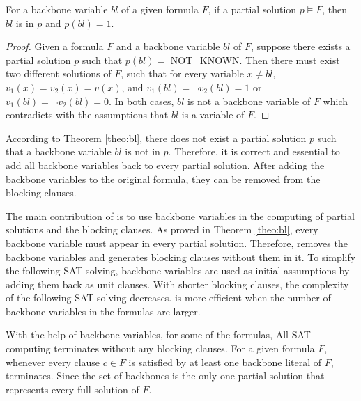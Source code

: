 \begin{theorem} \label{theo:bl}
For a backbone variable $bl$ of a given formula $F$, if a partial solution $p\models F$, then $bl$ is in $p$ and $p(bl)=1$.
\end{theorem}

\begin{proof}
Given a formula $F$ and a backbone variable $bl$ of $F$, suppose there exists a partial solution $p$ such that $p(bl)=$ NOT\_KNOWN. Then there must exist two different solutions of $F$, such that for every variable $x\neq bl$, $v_1(x)=v_2(x)=v(x)$, and $v_1(bl)=\neg v_2(bl)=1$ or $v_1(bl)=\neg v_2(bl)=0$. In both cases, $bl$ is not a backbone variable of $F$ which contradicts with the assumptions that $bl$ is a variable of $F$.
\end{proof}
According to Theorem \ref{theo:bl}, there does not exist a partial solution $p$ such that a backbone variable $bl$ is not in $p$. Therefore, it is correct and essential to add all backbone variables back to every partial solution.
After adding the backbone variables to the original formula, they can be removed from the blocking clauses.

The main contribution of \tool is to use backbone variables in the computing of partial solutions and the blocking clauses. As proved in Theorem \ref{theo:bl}, every backbone variable must appear in every partial solution. Therefore, \tool removes the backbone variables and generates blocking clauses without them in it. To simplify the following SAT solving, backbone variables are used as initial assumptions by adding them back as unit clauses. With shorter blocking clauses, the complexity of the following SAT solving decreases. \tool is more efficient when the number of backbone variables in the formulas are larger. 

With the help of backbone variables, for some of the formulas, All-SAT computing terminates without any blocking clauses.
For a given formula $F$, whenever every clause $c\in F$ is satisfied by at least one backbone literal of $F$, \tool terminates. Since the set of backbones is the only one partial solution that represents every full solution of $F$.

